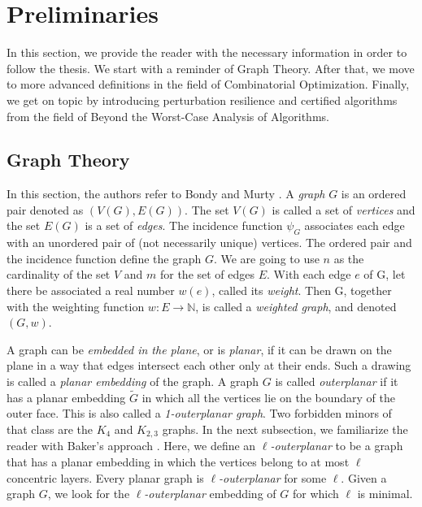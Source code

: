 \section{Preliminaries}
\label{section:preliminaries}

In this section, we provide the reader with the necessary information in order to follow the thesis. We start 
with a reminder of Graph Theory. After that, we move to more advanced definitions in the field of 
Combinatorial Optimization. Finally, we get on topic by introducing perturbation resilience and certified 
algorithms from the field of Beyond the Worst-Case Analysis of Algorithms.

\subsection{Graph Theory} 

In this section, the authors refer to Bondy and Murty \cite{bondy1976graph}.
A \textit{graph} $G$ is an ordered pair denoted as $(V(G), E(G))$.
The set $V(G)$ is called a set of \textit{vertices} and the set $E(G)$ is a set of \textit{edges}.
The incidence function $\psi_G$ associates each edge with an unordered pair of 
(not necessarily unique) vertices. The ordered pair and the incidence function define the graph $G$.
We are going to use $n$ as the cardinality 
of the set $V$ and $m$ for the set of edges $E$. With each edge $e$ of G, let there be associated 
a real number $w(e)$, called its \textit{weight}. Then G, together with the weighting function 
$w : E \to \mathbb{N}$, is called a \textit{weighted graph}, and denoted $(G, w)$.

 A graph can be \textit{embedded in the plane}, or is \textit{planar}, if it can be drawn on the 
plane in a way that edges intersect each other only at their ends. Such a drawing is called a 
\textit{planar embedding} of the graph. A graph $G$ is called \textit{outerplanar} if it has a 
planar embedding $\widetilde{G}$ in which all the vertices lie on the boundary of the outer face. 
This is also called a \textit{1-outerplanar graph}. Two forbidden minors of that class are the 
$K_4$ and $K_{2, 3}$ graphs. In the next subsection, we familiarize the reader with Baker's approach 
\cite{Baker}. Here, we define an \textit{$\ell$-outerplanar} to be a graph that has a planar embedding in which 
the vertices belong to at most $\ell$ concentric layers. Every planar graph is \textit{$\ell$-outerplanar} for 
some $\ell$. Given a graph $G$, we look for the \textit{$\ell$-outerplanar} embedding of $G$ for which $\ell$ is minimal.

